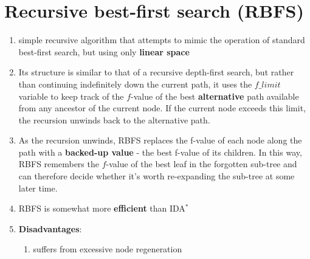 \section{Recursive best-first search (RBFS) \cite{ai/book/Artificial-Intelligence-A-Modern-Approach/Russell-Norvig}}
\label{AI: Algorithms/Recursive best-first search (RBFS)}


\begin{enumerate}[itemsep=0.2cm]
    \item simple recursive algorithm that attempts to mimic the operation of standard best-first search, but using only \textbf{linear space}
    \hfill \cite{ai/book/Artificial-Intelligence-A-Modern-Approach/Russell-Norvig}

    \item Its structure is similar to that of a recursive depth-first search, but rather than continuing indefinitely down the current path, it uses the $f\_limit$ variable to keep track of the $f$-value of the best \textbf{alternative} path available from any ancestor of the current node. 
    If the current node exceeds this limit, the recursion unwinds back to the alternative path.
    \hfill \cite{ai/book/Artificial-Intelligence-A-Modern-Approach/Russell-Norvig}

    \item As the recursion unwinds, RBFS replaces the f-value of each node along the path with a \textbf{backed-up value} - the best f-value of its children. 
    In this way, RBFS remembers the $f$-value of the best leaf in the forgotten sub-tree and can therefore decide whether it’s worth re-expanding the sub-tree at some later time.
    \hfill \cite{ai/book/Artificial-Intelligence-A-Modern-Approach/Russell-Norvig}

    \item RBFS is somewhat more \textbf{efficient} than IDA$^\ast$
    \hfill \cite{ai/book/Artificial-Intelligence-A-Modern-Approach/Russell-Norvig}

    \item \textbf{Disadvantages}:
    \begin{enumerate}
        \item suffers from excessive node regeneration
        \hfill \cite{ai/book/Artificial-Intelligence-A-Modern-Approach/Russell-Norvig}
    \end{enumerate}
\end{enumerate}


\vspace{0.5cm}

